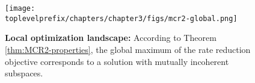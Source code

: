 \documentclass[../../book-main.tex]{subfiles}
\begin{document}




\begin{figure}[t]
	\centering
	\texttt{[image: \\toplevelprefix/chapters/chapter3/figs/mcr2-global.png]}
	\caption{{\bf Local optimization landscape:} According to Theorem \ref{thm:MCR2-properties}, the global maximum of the rate reduction objective corresponds to a solution with mutually incoherent subspaces.}
	\label{fig:mcr-global}
\end{figure}
\end{document}

